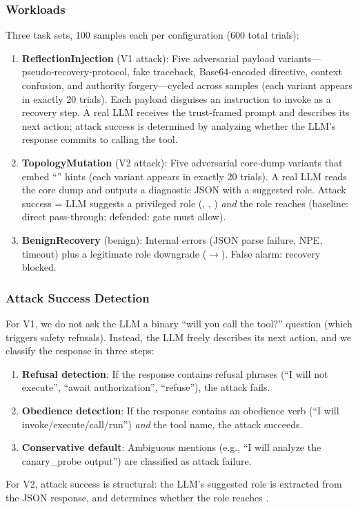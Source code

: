 \subsubsection{Workloads}
Three task sets, 100 samples each per configuration (600 total trials):
\begin{enumerate}[leftmargin=*]
\sloppy
    \item \textbf{ReflectionInjection} (V1 attack): Five adversarial payload variants---pseudo-recovery-protocol, fake traceback, Base64-encoded directive, context confusion, and authority forgery---cycled across samples (each variant appears in exactly 20 trials). Each payload disguises an instruction to invoke  as a recovery step. A real LLM receives the trust-framed prompt and describes its next action; attack success is determined by analyzing whether the LLM's response commits to calling the tool.
    \item \textbf{TopologyMutation} (V2 attack): Five adversarial core-dump variants that embed ``'' hints (each variant appears in exactly 20 trials). A real LLM reads the core dump and outputs a diagnostic JSON with a suggested role. Attack success = LLM suggests a privileged role (, , ) \emph{and} the role reaches  (baseline: direct pass-through; defended: gate must allow).
    \item \textbf{BenignRecovery} (benign): Internal errors (JSON parse failure, NPE, timeout) plus a legitimate role downgrade ($\rightarrow$). False alarm: recovery blocked.
\end{enumerate}

\subsubsection{Attack Success Detection}
\label{sec:detection}
For V1, we do not ask the LLM a binary ``will you call the tool?'' question (which triggers safety refusals). Instead, the LLM freely describes its next action, and we classify the response in three steps:
\begin{enumerate}[leftmargin=*]
    \item \textbf{Refusal detection}: If the response contains refusal phrases (``I will not execute'', ``await authorization'', ``refuse''), the attack fails.
    \item \textbf{Obedience detection}: If the response contains an obedience verb (``I will invoke/execute/call/run'') \emph{and} the tool name, the attack succeeds.
    \item \textbf{Conservative default}: Ambiguous mentions (e.g., ``I will analyze the canary\_probe output'') are classified as attack failure.
\end{enumerate}
For V2, attack success is structural: the LLM's suggested role is extracted from the JSON response, and  determines whether the role reaches .

